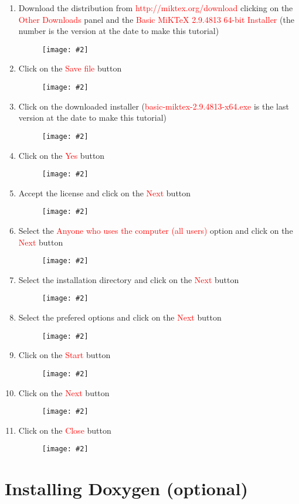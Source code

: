 \documentclass[a4paper]{article}
\newcommand{\FIG}[2]
{
	\begin{figure}[ht!]
	\centering
	\texttt{[image: \#2]}
	\end{figure}
}
\newcommand{\FIGUREB}[1]{\FIG{0.26}{#1}}
\newcommand{\RED}[1] {\textcolor{red}{#1}}
\begin{document}
\begin{enumerate}

\item Download the distribution from \RED{http://miktex.org/download} clicking
on the \RED{Other Downloads} panel and the
\RED{Basic MiKTeX 2.9.4813 64-bit Installer} (the number is the version at the
date to make this tutorial)
\FIGUREB{Latex-1.png.eps}

\clearpage

\item Click on the \RED{Save file} button
\FIGUREB{Latex-2.png.eps}

\item Click on the downloaded installer (\RED{basic-miktex-2.9.4813-x64.exe}
is the last version at the date to make this tutorial)
\FIGUREB{Latex-3.png.eps}

\clearpage

\item Click on the \RED{Yes} button
\FIGUREB{Latex-4.png.eps}

\item Accept the license and click on the \RED{Next} button
\FIGUREB{Latex-5.png.eps}

\clearpage

\item Select the \RED{Anyone who uses the computer (all users)} option and click
on the \RED{Next} button
\FIGUREB{Latex-6.png.eps}

\item Select the installation directory and click on the \RED{Next} button
\FIGUREB{Latex-7.png.eps}

\clearpage

\item Select the prefered options and click on the \RED{Next} button
\FIGUREB{Latex-8.png.eps}

\item Click on the \RED{Start} button
\FIGUREB{Latex-9.png.eps}

\clearpage

\item Click on the \RED{Next} button
\FIGUREB{Latex-10.png.eps}

\item Click on the \RED{Close} button
\FIGUREB{Latex-11.png.eps}

\end{enumerate}

\clearpage

\section{Installing Doxygen (optional)}
\end{document}
